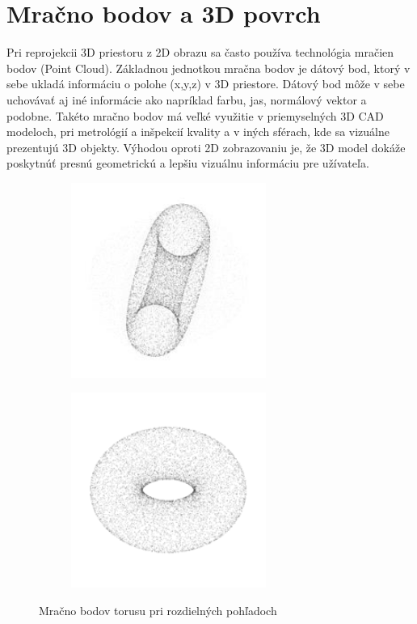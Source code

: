 \section{Mračno bodov a 3D povrch}

Pri reprojekcii 3D priestoru z 2D obrazu sa často používa technológia mračien bodov (Point Cloud). Základnou jednotkou mračna bodov je dátový bod, ktorý v sebe ukladá informáciu o polohe (x,y,z) v 3D priestore. Dátový bod môže v sebe uchovávať aj iné informácie ako napríklad farbu, jas, normálový vektor a podobne. Takéto mračno bodov má veľké využitie v priemyselných 3D CAD modeloch, pri metrológií a inšpekcií kvality a v iných sférach, kde sa vizuálne prezentujú 3D objekty. Výhodou oproti 2D zobrazovaniu je, že 3D model dokáže poskytnúť presnú geometrickú a lepšiu vizuálnu informáciu pre užívateľa.

\begin{figure}[!h]
	\centering
	\begin{subfigure}[b]{0.45\textwidth}
		\centering
		\includegraphics[width=0.7\textwidth]{figures/point_cloud_a.png}
		\caption{}
		\label{fig:point_cloud:a}
	\end{subfigure}
	\begin{subfigure}[b]{0.45\textwidth}
		\centering
		\includegraphics[width=0.7\textwidth]{figures/point_cloud_b.png}
		\caption{}
		\label{fig:point_cloud:b}
	\end{subfigure}
	\caption{Mračno bodov torusu pri rozdielných pohľadoch}
	\label{fig:point_cloud}
\end{figure}


